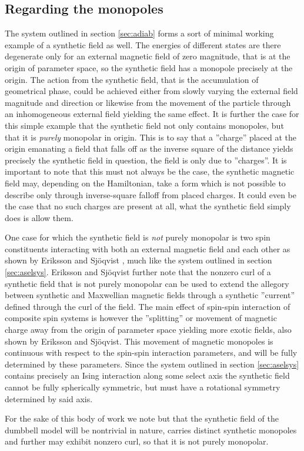 \documentclass[main.tex]{subfiles}
\begin{document}
\subsection{Regarding the monopoles}\label{sec:regmono}
The system outlined in section \ref{sec:adiab} forms a sort of minimal working example of a
synthetic field as well. The energies of different states are there degenerate only for an
external magnetic field of zero magnitude, that is at the origin of parameter space, so the
synthetic field has a monopole precisely at the origin. The action from the synthetic
field, that is the accumulation of geometrical phase, could be achieved either from slowly
varying the external field magnitude and direction or likewise from the movement of the
particle through an inhomogeneous external field yielding the same effect. It is further
the case for this simple example that the synthetic field not only contains monopoles, but
that it is \textit{purely} monopolar in origin. This is to say that a ''charge'' placed at
the origin emanating a field that falls off as the inverse square of the distance yields
precisely the synthetic field in question, the field is only due to
''charges''\cite{berry1984}. It is important to note that this must not
always be the case, the synthetic magnetic field may, depending on the Hamiltonian, take a
form which is not possible to describe only through inverse-square falloff from placed
charges. It could even be the case that no such charges are present at all, what the
synthetic field simply does is allow them. %

One case for which the synthetic field is \textit{not} purely monopolar is two spin
constituents interacting with both an external magnetic field and each other as shown by Eriksson and Sjöqvist
\cite{eriksson}, much like the system outlined in section \ref{sec:aselsys}. Eriksson and
Sjöqvist further note that the nonzero curl of a synthetic field that is not purely
monopolar can be used to extend the allegory between synthetic and Maxwellian magnetic
fields through a synthetic ''current'' defined through the curl of the field. The main
effect of spin-spin interaction of composite spin systems is however the ''splitting'' or
movement of magnetic charge away from the origin of parameter space yielding more exotic fields,
also shown by Eriksson and Sjöqvist. This movement of magnetic monopoles is continuous
with respect to the spin-spin interaction parameters, and will be fully determined by these
parameters. Since the system outlined in section
\ref{sec:aselsys} contains precisely an Ising interaction along some select axis the
synthetic field cannot be fully spherically symmetric, but must have a rotational symmetry
determined by said axis. 

For the sake of this body of work we note but that the synthetic field of the dumbbell
model will be nontrivial
in nature, carries distinct synthetic monopoles and further may exhibit nonzero curl, so
that it is not purely monopolar.
\end{document}
